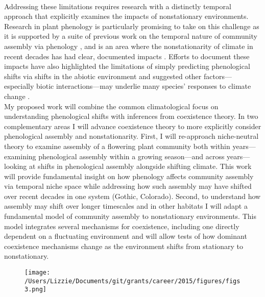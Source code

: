 \documentclass[12pt,a4paper,oneside]{article}
\begin{document}
\vspace{1.5ex}\\
Addressing these limitations requires research with a distinctly temporal approach that explicitly examines the impacts of nonstationary environments. Research in plant phenology is particularly promising to take on this challenge as it is supported by a suite of previous work on the temporal nature of community assembly via phenology \citep{Gleeson:1981wh,Rathcke:1988yc}, and is an area where the nonstationarity of climate in recent decades has had clear, documented impacts \citep{Menzel:2006sq}. Efforts to document these impacts have also highlighted the limitations of simply predicting phenological shifts via shifts in the abiotic environment and suggested other factors---especially biotic interactions---may underlie many species' responses to climate change \citep{Pau:2011wd}. 
\vspace{1.5ex}\\
My proposed work will combine the common climatological focus on understanding phenological shifts with inferences from coexistence theory. In two complementary areas I will advance coexistence theory to more explicitly consider phenological assembly and nonstationarity. First, I will re-approach niche-neutral theory to examine assembly of a flowering plant community both within years---examining phenological assembly within a growing season---and across years---looking at shifts in phenological assembly alongside shifting climate. This work will provide fundamental insight on how phenology affects community assembly via temporal niche space while addressing how such assembly may have shifted over recent decades in one system (Gothic, Colorado). Second, to understand how assembly may shift over longer timescales and in other habitats I will adapt a fundamental model of community assembly to nonstationary environments. This model integrates several mechanisms for coexistence, including one directly dependent on a fluctuating environment \citep{Chesson:1997dz} and will allow tests of how dominant coexistence mechanisms change as the environment shifts from stationary to nonstationary. \\
\begin{figure}[h!]
\begin{center}
\texttt{[image: /Users/Lizzie/Documents/git/grants/career/2015/figures/figs3.png]}
\end{center}
\end{figure}
\vspace{1.5ex}\\
\end{document}
